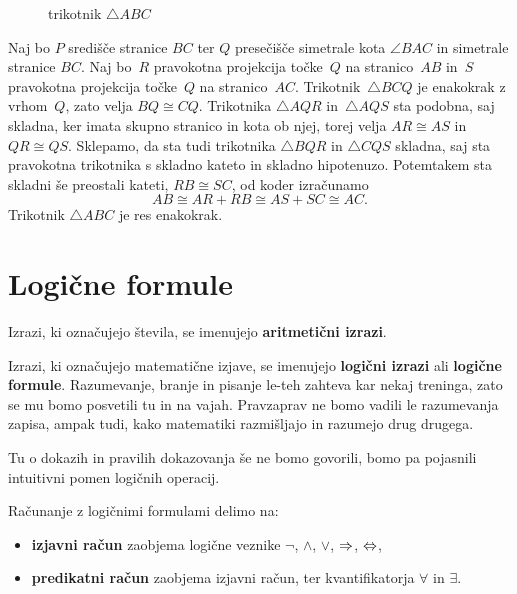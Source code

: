 \begin{dokaz}
\begin{figure}[ht]
\begin{center}
\end{center}
    \caption{trikotnik $\triangle ABC$}
    \label{fig:trikotnik}
  \end{figure}
  Naj bo $P$ središče stranice $BC$ ter $Q$ presečišče simetrale kota $\angle BAC$ in simetrale stranice $BC$.
  Naj bo~$R$ pravokotna projekcija točke~$Q$ na stranico~$AB$ in~$S$ pravokotna projekcija točke~$Q$ na stranico~$AC$.
  Trikotnik~$\triangle BCQ$ je enakokrak z vrhom~$Q$, zato velja $BQ \cong CQ$.
  Trikotnika $\triangle AQR$ in~$\triangle AQS$ sta podobna, saj skladna, ker imata skupno stranico in kota ob njej, torej velja $AR \cong AS$ in $QR \cong QS$.
  Sklepamo, da sta tudi trikotnika $\triangle BQR$ in $\triangle CQS$ skladna, saj sta pravokotna trikotnika s skladno kateto in skladno hipotenuzo. Potemtakem sta skladni še preostali kateti, $RB \cong SC$, od koder izračunamo
  \begin{equation*}
    AB \cong AR + RB \cong AS + SC \cong AC.
  \end{equation*}
  Trikotnik $\triangle ABC$ je res enakokrak.
\end{dokaz}

\section{Logične formule}

Izrazi, ki označujejo števila, se imenujejo \textbf{aritmetični izrazi}.

Izrazi, ki označujejo matematične izjave, se imenujejo \textbf{logični izrazi} ali \textbf{logične formule}. Razumevanje, branje in pisanje le-teh zahteva kar nekaj treninga, zato se mu bomo posvetili tu in na vajah. Pravzaprav ne bomo vadili le razumevanja zapisa, ampak tudi, kako matematiki razmišljajo in razumejo drug drugega.

Tu o dokazih in pravilih dokazovanja še ne bomo govorili, bomo pa pojasnili intuitivni pomen logičnih operacij.

Računanje z logičnimi formulami delimo na:
%
\begin{itemize}
\item \textbf{izjavni račun} zaobjema logične veznike $\neg $, $\land$, $\lor$, $\Rightarrow$, $\Leftrightarrow$,
\item \textbf{predikatni račun} zaobjema izjavni račun, ter kvantifikatorja $\forall$ in $\exists$.
\end{itemize}


